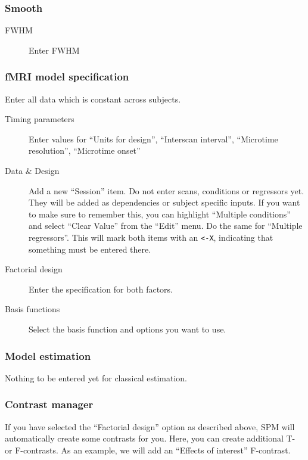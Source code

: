 \subsubsection*{Smooth}

\begin{description}
\item[FWHM] Enter FWHM
\end{description}

\subsubsection*{fMRI model specification} 

Enter all data which is constant across subjects. 
\begin{description}
\item[Timing parameters] Enter values for ``Units for design'', ``Interscan
  interval'', ``Microtime resolution'', ``Microtime onset''
\item[Data \& Design] Add a new ``Session'' item. Do not enter scans,
  conditions or regressors yet. They will be added as dependencies or
  subject specific inputs. If you want to make sure to remember this, you
  can highlight ``Multiple conditions'' and select ``Clear Value'' from the
  ``Edit'' menu. Do the same for ``Multiple regressors''. This will mark
  both items with an \verb|<-X|, indicating that something must be entered
  there.
\item[Factorial design] Enter the specification for both factors.
\item[Basis functions] Select the basis function and options you want to use.
\end{description}

\subsubsection*{Model estimation}

Nothing to be entered yet for classical estimation.

\subsubsection*{Contrast manager} 

If you have selected the ``Factorial design'' option as described above, SPM
will automatically create some contrasts for you. Here, you can create
additional T- or F-contrasts. As an example, we will add an ``Effects of
interest'' F-contrast. 

